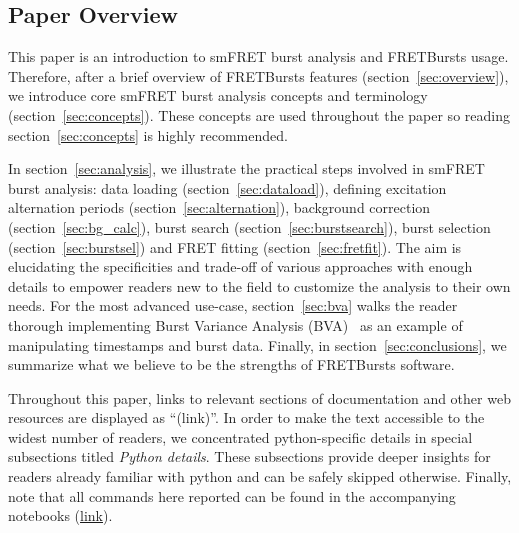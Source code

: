 \subsection{Paper Overview}
This paper is an introduction to smFRET burst analysis and FRETBursts usage.
Therefore, after a brief overview of FRETBursts features (section~\ref{sec:overview}),
we introduce core smFRET burst analysis concepts and terminology
(section~\ref{sec:concepts}). These concepts are used throughout the paper
so reading section~\ref{sec:concepts} is highly recommended.

In section~\ref{sec:analysis}, we illustrate the practical steps involved
in smFRET burst analysis: data loading (section~\ref{sec:dataload}), defining
excitation alternation periods (section~\ref{sec:alternation}), background
correction (section~\ref{sec:bg_calc}), burst search (section~\ref{sec:burstsearch}),
burst selection (section~\ref{sec:burstsel}) and FRET fitting (section~\ref{sec:fretfit}).
The aim is elucidating the specificities and trade-off of various approaches
with enough details to empower readers new to the field to customize the analysis to their own needs.
For the most advanced use-case, section~\ref{sec:bva} walks the reader thorough implementing
Burst Variance Analysis (BVA)~\cite{Torella_2011} as an example of manipulating timestamps
and burst data.
Finally, in section~\ref{sec:conclusions}, we summarize what we believe to be
the strengths of FRETBursts software.

Throughout this paper,
links to relevant sections of documentation and other web resources
are displayed as ``(link)''.
In order to make the text accessible to the widest number of readers,
we concentrated python-specific details in special subsections titled
\textit{Python details}. These subsections provide deeper insights for readers
already familiar with python and can be safely skipped otherwise.
Finally, note that all commands here reported can be found in the
accompanying notebooks
(\href{https://github.com/tritemio/fretbursts_paper}{link}).

